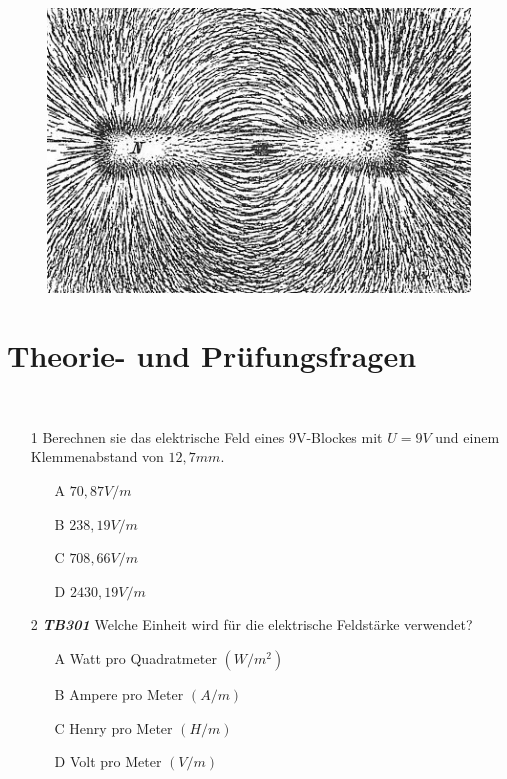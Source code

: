\begin{figure}
 \vspace{-6cm}
  \includegraphics[scale=0.35]{Felder/Bilder/Magnet.jpg}
 \vspace{-6cm}
\end{figure}

\section{Theorie- und Prüfungsfragen}

~~~~~~
\begin{enumerate} 
\itemsep1pt\parskip0pt
\item[1] Berechnen sie das elektrische Feld eines 9V-Blockes mit $U = 9V$ und einem Klemmenabstand von $12,7mm$.
	\begin{enumerate}
	\itemsep1pt\parskip0pt
		\item[A] $70,87V/m$
		\item[B] $238,19V/m$
		\item[C] $708,66V/m$
		\item[D] $2430,19V/m$
	\end{enumerate}
\end{enumerate}


\begin{enumerate} 
\itemsep1pt\parskip0pt
\item[2] \emph{\textbf{TB301}} Welche Einheit wird für die elektrische Feldstärke verwendet?
	\begin{enumerate}
	\itemsep1pt\parskip0pt
		\item[A] Watt pro Quadratmeter $(W/m^2)$
		\item[B] Ampere pro Meter $(A/m)$
		\item[C] Henry pro Meter $(H/m)$
		\item[D] Volt pro Meter $(V/m)$
	\end{enumerate}
\end{enumerate}

